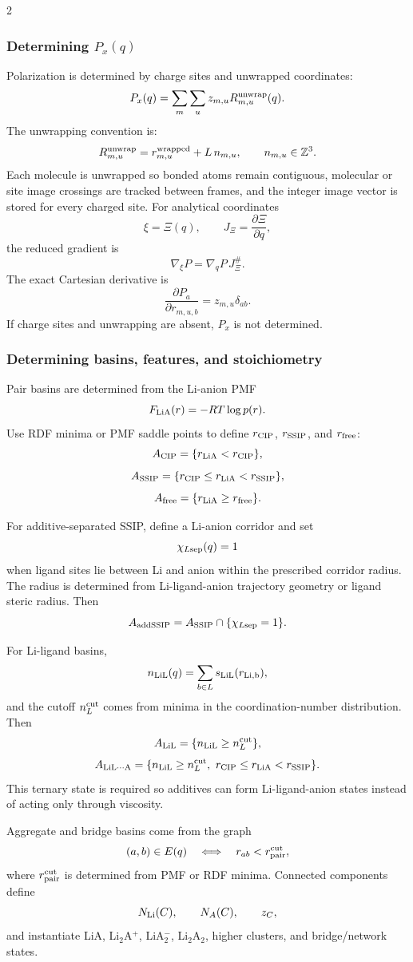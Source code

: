 \documentclass[10pt]{article}
\begin{document}
\begin{multicols}{2}
\subsubsection{Determining \(P_x(q)\)}

Polarization is determined by charge sites and unwrapped coordinates:
\[
P_x(q)=
\sum_m\sum_u z_{m,u}R_{m,u}^{\rm unwrap}(q).
\]
The unwrapping convention is:
\[
R_{m,u}^{\rm unwrap}
=
r_{m,u}^{\rm wrapped}+L\,n_{m,u},
\qquad
n_{m,u}\in\mathbb Z^3.
\]
Each molecule is unwrapped so bonded atoms remain contiguous, molecular or site
image crossings are tracked between frames, and the integer image vector is
stored for every charged site. For analytical coordinates
\[
\xi=\Xi(q),
\qquad
J_\Xi=\frac{\partial\Xi}{\partial q},
\]
the reduced gradient is
\[
\nabla_\xi P=\nabla_qP\,J_\Xi^\#.
\]
The exact Cartesian derivative is
\[
\frac{\partial P_a}{\partial r_{m,u,b}}
=
z_{m,u}\delta_{ab}.
\]
If charge sites and unwrapping are absent, \(P_x\) is not determined.

\subsubsection{Determining basins, features, and stoichiometry}

Pair basins are determined from the Li-anion PMF
\[
F_{\rm LiA}(r)=-RT\log p(r).
\]
Use RDF minima or PMF saddle points to define \(r_{\rm CIP}\), \(r_{\rm SSIP}\),
and \(r_{\rm free}\):
\[
A_{\rm CIP}=\{r_{\rm LiA}<r_{\rm CIP}\},
\]
\[
A_{\rm SSIP}=\{r_{\rm CIP}\le r_{\rm LiA}<r_{\rm SSIP}\},
\]
\[
A_{\rm free}=\{r_{\rm LiA}\ge r_{\rm free}\}.
\]

For additive-separated SSIP, define a Li-anion corridor and set
\[
\chi_{L{\rm sep}}(q)=1
\]
when ligand sites lie between Li and anion within the prescribed corridor
radius. The radius is determined from Li-ligand-anion trajectory geometry or
ligand steric radius. Then
\[
A_{\rm addSSIP}=A_{\rm SSIP}\cap\{\chi_{L{\rm sep}}=1\}.
\]

For Li-ligand basins,
\[
n_{\rm LiL}(q)=\sum_{b\in L}s_{\rm LiL}(r_{\rm Li,b}),
\]
and the cutoff \(n_L^{\rm cut}\) comes from minima in the coordination-number
distribution. Then
\[
A_{\rm LiL}=\{n_{\rm LiL}\ge n_L^{\rm cut}\},
\]
\[
A_{\rm LiL\cdots A}
=
\{n_{\rm LiL}\ge n_L^{\rm cut},\
r_{\rm CIP}\le r_{\rm LiA}<r_{\rm SSIP}\}.
\]
This ternary state is required so additives can form Li-ligand-anion states
instead of acting only through viscosity.

Aggregate and bridge basins come from the graph
\[
(a,b)\in E(q)\quad\Longleftrightarrow\quad r_{ab}<r_{\rm pair}^{\rm cut},
\]
where \(r_{\rm pair}^{\rm cut}\) is determined from PMF or RDF minima. Connected
components define
\[
N_{\rm Li}(C),\qquad N_A(C),\qquad z_C,
\]
and instantiate LiA, Li\(_2\)A\(^+\), LiA\(_2^-\), Li\(_2\)A\(_2\), higher
clusters, and bridge/network states.


\end{multicols}
\end{document}
